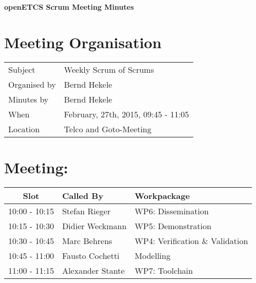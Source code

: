\documentclass[a4paper, 11pt]{article}
\begin{document}
{\begin{center}\huge\bf openETCS Scrum Meeting Minutes\end{center}}
\section{Meeting Organisation}

\renewcommand{\arraystretch}{1.5}
\begin{supertabular}{m{.2\textwidth}m{.8\textwidth}}
Subject & Weekly Scrum of Scrums\\
Organised by &Bernd Hekele\\
Minutes by & Bernd Hekele\\
When & February, 27th, 2015, 09:45 - 11:05\\
Location & Telco and Goto-Meeting\\
\end{supertabular}

\renewcommand{\arraystretch}{1.0}
\section{Meeting:}

\begin{tabular}{|c|l|l|}
\hline
\textbf{Slot} &  \textbf{Called By} & \textbf{Workpackage} \\
\hline  
10:00 - 10:15 & Stefan Rieger & WP6: Dissemination \\\hline  
10:15 - 10:30 & Didier Weckmann & WP5: Demonstration \\\hline  
10:30 - 10:45 & Marc Behrens & WP4: Verification \& Validation \\\hline  
10:45 - 11:00 & Fausto Cochetti & Modelling \\\hline  
11:00 - 11:15 & Alexander Stante  & WP7: Toolchain \\\hline
\end{tabular}
\end{document}
